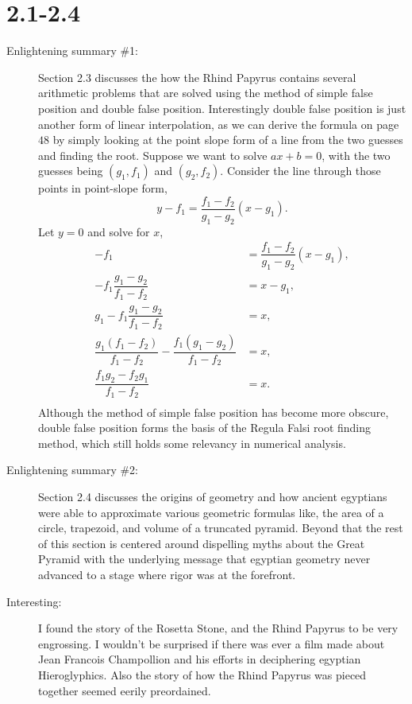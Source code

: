 \documentclass[12pt]{article}
\theoremstyle{homework}
\begin{document}
\section*{2.1-2.4}

\begin{description}
\item[Enlightening summary \#1:] Section 2.3 discusses the how the Rhind Papyrus contains several
arithmetic problems that are solved using the method of simple false position and double false position.
Interestingly double false position is just another form of linear interpolation, as we can derive the formula on page $48$
by simply looking at the point slope form of a line from the two guesses and finding the root. Suppose we want to solve $ax+b = 0$, with 
the two guesses being  $(g_1, f_1)$ and $(g_2, f_2)$. Consider the line through those points in point-slope form, 
\begin{equation*}
    y - f_1 = \dfrac{f_1-f_2}{g_1 - g_2}(x - g_1).
\end{equation*}
Let $y = 0$ and solve for $x$, 
\begin{align*}
    -f_1 &= \dfrac{f_1-f_2}{g_1 - g_2}(x - g_1),\\
    -f_1\dfrac{g_1 - g_2}{f_1-f_2} &= x - g_1,\\
    g_1 - f_1\dfrac{g_1 - g_2}{f_1-f_2} &= x,\\
    \dfrac{g_1(f_1-f_2)}{f_1-f_2} - \dfrac{f_1(g_1 - g_2)}{f_1-f_2} &= x,\\
    \dfrac{f_1g_2 - f_2g_1}{f_1-f_2} &= x.\\
\end{align*}
Although the method of simple false position has become more obscure, double false position forms the basis of the Regula Falsi 
root finding method, which still holds some relevancy in numerical analysis.


\item[Enlightening summary \#2:] Section 2.4 discusses the origins of geometry and how ancient egyptians were able to approximate various 
geometric formulas like, the area of a circle, trapezoid, and volume of a truncated pyramid. Beyond that the rest of this section is centered around dispelling myths 
about the Great Pyramid with the underlying message that egyptian geometry never advanced to a stage where rigor was at the forefront. 


\item[Interesting:] I found the story of the Rosetta Stone, and the Rhind Papyrus to be very engrossing. I wouldn't be surprised if there was ever a film made about Jean Francois 
Champollion and his efforts in deciphering egyptian Hieroglyphics. Also the story of how the Rhind Papyrus was pieced together seemed eerily preordained. 


\end{description}
\end{document}
